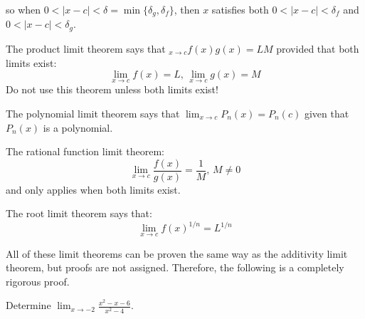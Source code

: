 \begin{itemize}
\begin{prooof}
\begin{center}
        \end{center}
        so when $0<|x-c|<\delta=\min\{\delta_g,\delta_f\}$, then $x$ satisfies both $0<|x-c|<\delta_f$ and $0<|x-c|<\delta_g$.
    \end{prooof}
    \begin{theorem}
        The product limit theorem says that $\displaystyle_{x\to c} f(x)g(x)=LM$ provided that both limits exist:
        \begin{equation}
            \lim_{x\to c}f(x)=L,\, \lim_{x\to c} g(x)=M
            \label{eq:}
        \end{equation}
        Do not use this theorem unless both limits exist!
    \end{theorem}
    \begin{theorem}
        The polynomial limit theorem says that $\displaystyle \lim_{x\to c} P_n(x) = P_n(c)$ given that $P_n(x)$ is a polynomial.
    \end{theorem}
    \begin{theorem}
        The rational function limit theorem:
        \begin{equation}
            \lim_{x\to c} \frac{f(x)}{g(x)} = \frac{1}{M},\, M\neq 0
            \label{eq:}
        \end{equation}
        and only applies when both limits exist.
    \end{theorem}
    \begin{theorem}
        The root limit theorem says that:
        \begin{equation}
            \lim_{x\to c} f(x)^{1/n} = L^{1/n}
            \label{eq:}
        \end{equation}
    \end{theorem}
    All of these limit theorems can be proven the same way as the additivity limit theorem, but proofs are not assigned. Therefore, the following is a completely rigorous proof.
    \begin{example}
        Determine $\displaystyle \lim_{x\to -2} \frac{x^2-x-6}{x^2-4}$.
        \vspace{2mm}


\end{example}
\end{itemize}

